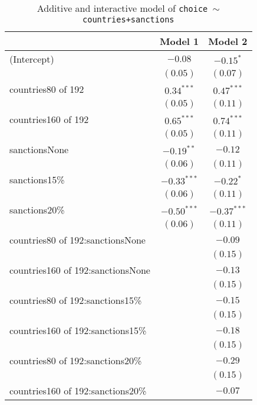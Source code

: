 \documentclass[12pt,letterpaper]{article}
\begin{document}
\begin{enumerate}
\begin{table}[h!]
	\caption{Additive and interactive model of \texttt{choice $\sim$ countries+sanctions}}
	\vspace{.25cm}
	\label{table:coefficients2}
	\centering
	\begin{adjustbox}{width=.65\textwidth}
		\begin{tabular}{l c c}
			\hline
			& Model 1 & Model 2 \\
			\hline
			(Intercept)                       & $-0.08$       & $-0.15^{*}$   \\
			& $(0.05)$      & $(0.07)$      \\
			countries80 of 192                & $0.34^{***}$  & $0.47^{***}$  \\
			& $(0.05)$      & $(0.11)$      \\
			countries160 of 192               & $0.65^{***}$  & $0.74^{***}$  \\
			& $(0.05)$      & $(0.11)$      \\
			sanctionsNone                     & $-0.19^{**}$  & $-0.12$       \\
			& $(0.06)$      & $(0.11)$      \\
			sanctions15\%                     & $-0.33^{***}$ & $-0.22^{*}$   \\
			& $(0.06)$      & $(0.11)$      \\
			sanctions20\%                     & $-0.50^{***}$ & $-0.37^{***}$ \\
			& $(0.06)$      & $(0.11)$      \\
			countries80 of 192:sanctionsNone  &               & $-0.09$       \\
			&               & $(0.15)$      \\
			countries160 of 192:sanctionsNone &               & $-0.13$       \\
			&               & $(0.15)$      \\
			countries80 of 192:sanctions15\%  &               & $-0.15$       \\
			&               & $(0.15)$      \\
			countries160 of 192:sanctions15\% &               & $-0.18$       \\
			&               & $(0.15)$      \\
			countries80 of 192:sanctions20\%  &               & $-0.29$       \\
			&               & $(0.15)$      \\
			countries160 of 192:sanctions20\% &               & $-0.07$       \\

\end{tabular}
\end{adjustbox}
\end{table}
\end{enumerate}
\end{document}
